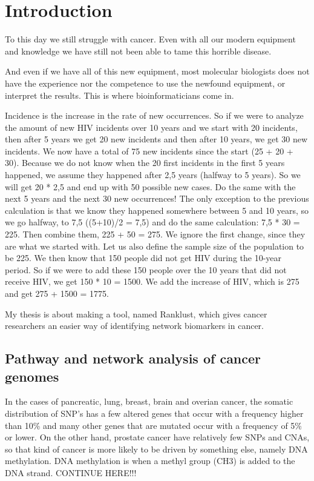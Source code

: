 \part{Introduction}
To this day we still struggle with cancer. Even with all our modern equipment
and knowledge we have still not been able to tame this horrible disease. 

And even if we have all of this new equipment, most molecular biologists does
not have the experience nor the competence to use the newfound equipment, or
interpret the results. This is where bioinformaticians come in. 

Incidence is the increase in the rate of new occurrences. So if we were to
analyze the amount of new HIV incidents over 10 years and we start with 20
incidents, then after 5 years we get 20 new incidents and then after 10 years,
we get 30 new incidents. We now have a total of 75 new incidents since the start
(25 + 20 + 30).  Because we do not know when the 20 first incidents in the first
5 years happened, we assume they happened after 2,5 years (halfway to 5 years).
So we will get 20 * 2,5 and end up with 50 possible new cases. Do the same with
the next 5 years and the next 30 new occurrences! The only exception to the
previous calculation is that we know they happened somewhere between 5 and 10
years, so we go halfway, to 7,5 ((5+10)/2 = 7,5) and do the same calculation:
7,5 * 30 = 225. Then combine them, 225 + 50 = 275. We ignore the first change,
since they are what we started with. Let us also define the sample size of the
population to be 225. We then know that 150 people did not get HIV during the
10-year period. So if we were to add these 150 people over the 10 years that did
not receive HIV, we get 150 * 10 = 1500. We add the increase of HIV, which is
275 and get 275 + 1500 = 1775. 

My thesis is about making a tool, named Ranklust, which gives cancer researchers
an easier way of identifying network biomarkers in cancer. 

\chapter{Pathway and network analysis of cancer genomes}
In the cases of pancreatic, lung, breast, brain and overian cancer, the somatic
distribution of SNP's has a few altered genes that occur with a frequency higher
than 10\% and many other genes that are mutated occur with a frequency of 5\% or
lower\cite{pathway-network}. On the other hand, prostate cancer have relatively
few SNPs and CNAs, so that kind of cancer is more likely to be driven by
something else, namely DNA methylation. DNA methylation is when a methyl group
(CH3) is added\cite{dna-methyl} to the DNA strand. CONTINUE HERE!!!

